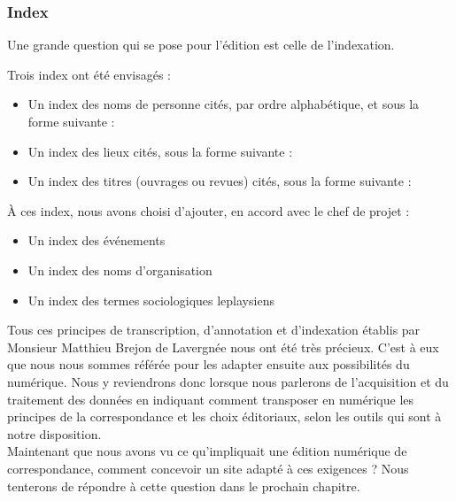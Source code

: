  
\subsubsection{Index}
 
Une grande question qui se pose pour l'édition est celle de l'indexation.

Trois index ont été envisagés : 
\begin{itemize}
    \item Un index des noms de personne cités, par ordre alphabétique, et sous la forme suivante :\\
\item Un index des lieux cités, sous la forme suivante : \\
\item Un index des titres (ouvrages ou revues) cités, sous la forme suivante :\\
\end{itemize}
 
À ces index, nous avons choisi d'ajouter, en accord avec le chef de projet : 
\begin{itemize}
    \item Un index des événements
    \item Un index des noms d'organisation
    \item Un index des termes sociologiques leplaysiens\\
\end{itemize}
 
Tous ces principes de transcription, d'annotation et d'indexation établis par Monsieur Matthieu Brejon de Lavergnée nous ont été très précieux. C'est à eux que nous nous sommes référée pour les adapter ensuite aux possibilités du numérique. Nous y reviendrons donc lorsque nous parlerons de l'acquisition et du traitement des données en indiquant comment transposer en numérique les principes de la correspondance et les choix éditoriaux, selon les outils qui sont à notre disposition.\\

Maintenant que nous avons vu ce qu'impliquait une édition numérique de correspondance, comment concevoir un site adapté à ces exigences ? Nous tenterons de répondre à cette question dans le prochain chapitre.
 
